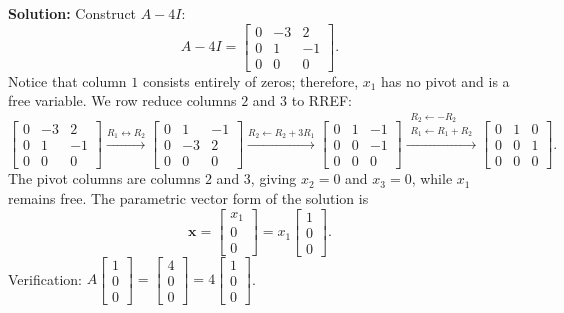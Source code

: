 \documentclass[11pt, letterpaper]{article}
\theoremstyle{definition}
\theoremstyle{remark}
\begin{document}
\textbf{Solution:}
Construct $A - 4I$:
\[
A - 4I = \begin{bmatrix} 0 & -3 & 2 \\ 0 & 1 & -1 \\ 0 & 0 & 0 \end{bmatrix}.
\]
Notice that column $1$ consists entirely of zeros; therefore, $x_1$ has no pivot and is a free variable. We row reduce columns $2$ and $3$ to RREF:
\[
\begin{bmatrix} 0 & -3 & 2 \\ 0 & 1 & -1 \\ 0 & 0 & 0 \end{bmatrix}
\xrightarrow{R_1 \leftrightarrow R_2}
\begin{bmatrix} 0 & 1 & -1 \\ 0 & -3 & 2 \\ 0 & 0 & 0 \end{bmatrix}
\xrightarrow{R_2 \leftarrow R_2 + 3R_1}
\begin{bmatrix} 0 & 1 & -1 \\ 0 & 0 & -1 \\ 0 & 0 & 0 \end{bmatrix}
\xrightarrow{\substack{R_2 \leftarrow -R_2 \\ R_1 \leftarrow R_1 + R_2}}
\begin{bmatrix} 0 & 1 & 0 \\ 0 & 0 & 1 \\ 0 & 0 & 0 \end{bmatrix}.
\]
The pivot columns are columns $2$ and $3$, giving $x_2 = 0$ and $x_3 = 0$, while $x_1$ remains free. The parametric vector form of the solution is
\[
\mathbf{x} = \begin{bmatrix} x_1 \\ 0 \\ 0 \end{bmatrix} = x_1 \begin{bmatrix} 1 \\ 0 \\ 0 \end{bmatrix}.
\]
Verification: $A\begin{bmatrix} 1 \\ 0 \\ 0 \end{bmatrix} = \begin{bmatrix} 4 \\ 0 \\ 0 \end{bmatrix} = 4\begin{bmatrix} 1 \\ 0 \\ 0 \end{bmatrix}$.
\end{document}
